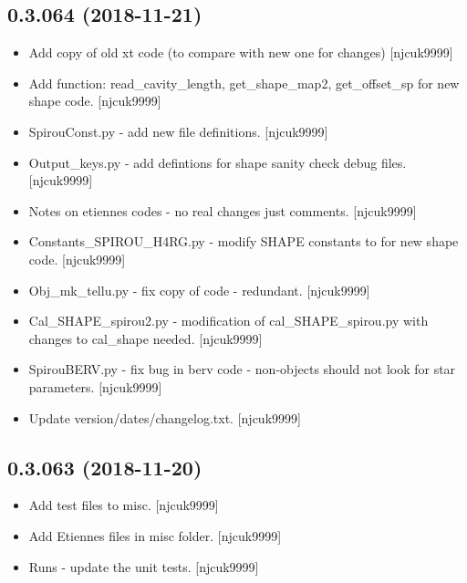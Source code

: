 \documentclass[a4paper,10pt,english]{report}
\begin{document}
\subsection{0.3.064 (2018-11-21)}
\label{\detokenize{misc/changelog:id257}}\begin{itemize}
\item {} 
Add copy of old xt code (to compare with new one for changes)
{[}njcuk9999{]}

\item {} 
Add function: read\_cavity\_length, get\_shape\_map2, get\_offset\_sp for
new shape code. {[}njcuk9999{]}

\item {} 
SpirouConst.py - add new file definitions. {[}njcuk9999{]}

\item {} 
Output\_keys.py - add defintions for shape sanity check debug files.
{[}njcuk9999{]}

\item {} 
Notes on etiennes codes - no real changes just comments. {[}njcuk9999{]}

\item {} 
Constants\_SPIROU\_H4RG.py - modify SHAPE constants to for new shape
code. {[}njcuk9999{]}

\item {} 
Obj\_mk\_tellu.py - fix copy of code - redundant. {[}njcuk9999{]}

\item {} 
Cal\_SHAPE\_spirou2.py - modification of cal\_SHAPE\_spirou.py with
changes to cal\_shape needed. {[}njcuk9999{]}

\item {} 
SpirouBERV.py - fix bug in berv code - non-objects should not look for
star parameters. {[}njcuk9999{]}

\item {} 
Update version/dates/changelog.txt. {[}njcuk9999{]}

\end{itemize}


\subsection{0.3.063 (2018-11-20)}
\label{\detokenize{misc/changelog:id258}}\begin{itemize}
\item {} 
Add test files to misc. {[}njcuk9999{]}

\item {} 
Add Etiennes files in misc folder. {[}njcuk9999{]}

\item {} 
Runs - update the unit tests. {[}njcuk9999{]}

\end{itemize}
\end{document}
